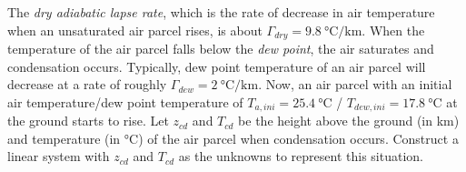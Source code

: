 \begin{Exercise}
\label{ex:lapse}
The \textit{dry adiabatic lapse rate}, which is the rate of decrease in air temperature when an unsaturated air parcel rises, is about $\Gamma_{dry} = \SI{9.8}{\celsius \per \km}$. When the temperature of the air parcel falls below the \textit{dew point}, the air saturates and condensation occurs. Typically, dew point temperature of an air parcel will decrease at a rate of roughly $\Gamma_{dew} = \SI{2}{\celsius \per \km}$. Now, an air parcel with an initial air temperature/dew point temperature of $T_{a,ini} = \SI{25.4}{\celsius}$ / $T_{dew, ini} = \SI{17.8}{\celsius}$ at the ground starts to rise. Let $z_{cd}$ and $T_{cd}$ be the height above the ground (in \si{\km}) and temperature (in \si{\celsius}) of the air parcel when condensation occurs. Construct a linear system with $z_{cd}$ and $T_{cd}$ as the unknowns to represent this situation.
\end{Exercise}
